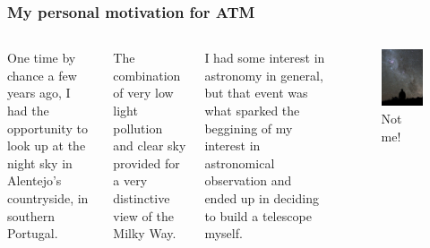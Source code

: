 \documentclass{beamer}
\begin{document}
\begin{frame}
\frametitle{My personal motivation for ATM}
\begin{columns}
One time by chance a few years ago, I had the opportunity to look up at the night sky in Alentejo's countryside, in southern Portugal.

The combination of very low light pollution and clear sky provided for a very distinctive view of the Milky Way.

I had some interest in astronomy in general, but that event was what sparked the beggining of my interest in astronomical observation and ended up in deciding to build a telescope myself.
\begin{figure}
\includegraphics[scale=0.45]{assets/800px-Starry_Night_at_La_Silla.jpg}
\caption{Not me!}
\end{figure}
\end{columns}
\end{frame}
\end{document}
